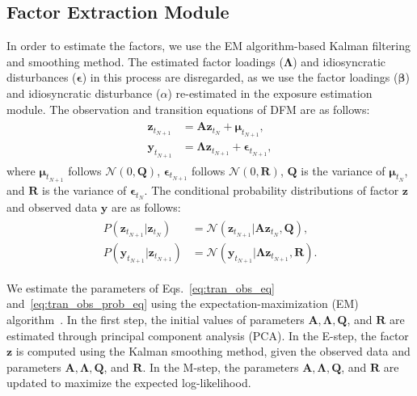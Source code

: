 \documentclass[sigconf]{acmart}
\begin{document}
\subsection{Factor Extraction Module}
In order to estimate the factors, we use the EM algorithm-based Kalman filtering and smoothing method. The estimated factor loadings ($\mathbf{\Lambda}$) and idiosyncratic disturbances ($\bm{\epsilon}$) in this process are disregarded, as we use the factor loadings ($\mathbf{\bm{\beta}}$) and idiosyncratic disturbance ($\alpha$) re-estimated in the exposure estimation module. The observation and transition equations of DFM are as follows:
\begin{align}\label{eq:tran_obs_eq}
    \begin{split}
        \mathbf{z}_{t_{N+1}} &= \mathbf{A}\mathbf{z}_{t_N} + \bm{\mu}_{t_{N+1}}, \\
        \mathbf{y}_{t_{N+1}} &= \mathbf{\Lambda} \mathbf{z}_{t_{N+1}} + \bm{\epsilon}_{t_{N+1}},
    \end{split}
\end{align} where $\bm{\mu}_{t_{N+1}}$ follows $\mathcal{N}(0, \mathbf{Q})$, $\bm{\epsilon}_{t_{N+1}}$ follows $\mathcal{N}(0, \mathbf{R})$, $\mathbf{Q}$ is the variance of $\bm{\mu}_{t_N}$, and $\mathbf{R}$ is the variance of $\bm{\epsilon}_{t_N}$. The conditional probability distributions of factor $\mathbf{z}$ and observed data $\mathbf{y}$ are as follows:
\begin{align}\label{eq:tran_obs_prob_eq}
    \begin{split}
        P(\mathbf{z}_{t_{N+1}}|\mathbf{z}_{t_N}) &= \mathcal{N}(\mathbf{z}_{t_{N+1}}|\mathbf{A}\mathbf{z}_{t_N},\mathbf{Q}), \\
        P(\mathbf{y}_{t_{N+1}}|\mathbf{z}_{t_{N+1}}) &= \mathcal{N}(\mathbf{y}_{t_{N+1}}|\mathbf{\Lambda} \mathbf{z}_{t_{N+1}},\mathbf{R}).
    \end{split}
\end{align} 

We estimate the parameters of Eqs.~\eqref{eq:tran_obs_eq} and~\eqref{eq:tran_obs_prob_eq} using the expectation-maximization (EM) algorithm~\cite{dempster1977maximum,watson1983alternative,stock2011dynamic}. In the first step, the initial values of parameters $\mathbf{A}, \mathbf{\Lambda}, \mathbf{Q}$, and $\mathbf{R}$ are estimated through principal component analysis (PCA). In the E-step, the factor $\mathbf{z}$ is computed using the Kalman smoothing method, given the observed data and parameters $\mathbf{A}, \mathbf{\Lambda}, \mathbf{Q}$, and $\mathbf{R}$. In the M-step, the parameters $\mathbf{A}, \mathbf{\Lambda}, \mathbf{Q}$, and $\mathbf{R}$ are updated to maximize the expected log-likelihood. 
\end{document}
